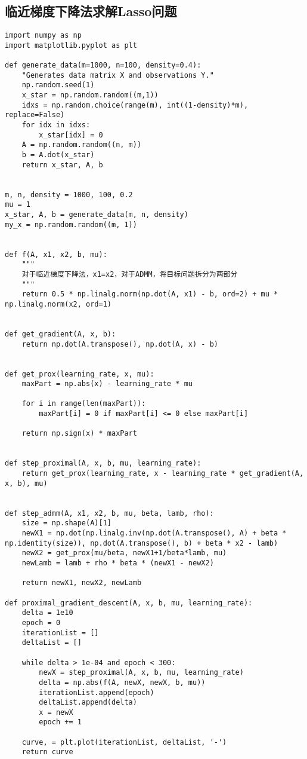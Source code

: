 \subsection{临近梯度下降法求解Lasso问题}
\begin{lstlisting}
import numpy as np
import matplotlib.pyplot as plt

def generate_data(m=1000, n=100, density=0.4):
    "Generates data matrix X and observations Y."
    np.random.seed(1)
    x_star = np.random.random((m,1))
    idxs = np.random.choice(range(m), int((1-density)*m), replace=False)
    for idx in idxs:
        x_star[idx] = 0
    A = np.random.random((n, m))
    b = A.dot(x_star)
    return x_star, A, b


m, n, density = 1000, 100, 0.2
mu = 1
x_star, A, b = generate_data(m, n, density)
my_x = np.random.random((m, 1))


def f(A, x1, x2, b, mu):
    """
    对于临近梯度下降法，x1=x2，对于ADMM，将目标问题拆分为两部分
    """
    return 0.5 * np.linalg.norm(np.dot(A, x1) - b, ord=2) + mu * np.linalg.norm(x2, ord=1)


def get_gradient(A, x, b):
    return np.dot(A.transpose(), np.dot(A, x) - b)


def get_prox(learning_rate, x, mu):
    maxPart = np.abs(x) - learning_rate * mu
    
    for i in range(len(maxPart)):
        maxPart[i] = 0 if maxPart[i] <= 0 else maxPart[i]
    
    return np.sign(x) * maxPart


def step_proximal(A, x, b, mu, learning_rate):
    return get_prox(learning_rate, x - learning_rate * get_gradient(A, x, b), mu)


def step_admm(A, x1, x2, b, mu, beta, lamb, rho):
    size = np.shape(A)[1]
    newX1 = np.dot(np.linalg.inv(np.dot(A.transpose(), A) + beta * np.identity(size)), np.dot(A.transpose(), b) + beta * x2 - lamb)
    newX2 = get_prox(mu/beta, newX1+1/beta*lamb, mu)
    newLamb = lamb + rho * beta * (newX1 - newX2)

    return newX1, newX2, newLamb

def proximal_gradient_descent(A, x, b, mu, learning_rate):
    delta = 1e10
    epoch = 0
    iterationList = []
    deltaList = []

    while delta > 1e-04 and epoch < 300:
        newX = step_proximal(A, x, b, mu, learning_rate)
        delta = np.abs(f(A, newX, newX, b, mu))
        iterationList.append(epoch)
        deltaList.append(delta)
        x = newX
        epoch += 1
    
    curve, = plt.plot(iterationList, deltaList, '-')
    return curve
\end{lstlisting}

